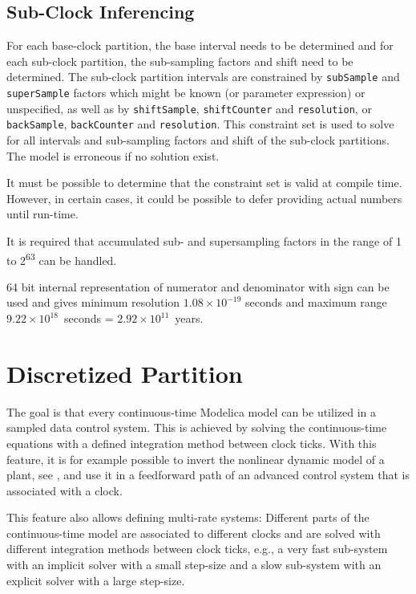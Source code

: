 \subsection{Sub-Clock Inferencing}\label{sub-clock-inferencing}

For each base-clock partition, the base interval needs to be determined and for each sub-clock partition, the sub-sampling factors and shift need to be determined.
The sub-clock partition intervals are constrained by \lstinline!subSample! and \lstinline!superSample! factors which might be known (or parameter expression) or unspecified, as well as by \lstinline!shiftSample!, \lstinline!shiftCounter! and \lstinline!resolution!, or \lstinline!backSample!, \lstinline!backCounter! and \lstinline!resolution!.
This constraint set is used to solve for all intervals and sub-sampling factors and shift of the sub-clock partitions.
The model is erroneous if no solution exist.

\begin{nonnormative}
It must be possible to determine that the constraint set is valid at compile time.
However, in certain cases, it could be possible to defer providing actual numbers until run-time.
\end{nonnormative}

It is required that accumulated sub- and supersampling factors in the range of 1 to 2\textsuperscript{63} can be handled.

\begin{nonnormative}
64 bit internal representation of numerator and denominator with sign can be used and gives minimum resolution $1.08\times 10^{-19}$ seconds and maximum range $9.22\times 10^{18}$~seconds = $2.92\times 10^{11}$~years.
\end{nonnormative}

\section{Discretized Partition}\label{continuous-time-equations-in-clocked-partitions}\label{discretized-partition}

\begin{nonnormative}
The goal is that every continuous-time Modelica model can be utilized in a sampled data control system.
This is achieved by solving the continuous-time equations with a defined integration method between clock ticks.
With this feature, it is for example possible to invert the nonlinear dynamic model of a plant, see \textcite{ThummelEtAl2005InverseModels}, and use it in a feedforward path of an advanced control system that is associated with a clock.

This feature also allows defining multi-rate systems: Different parts of the continuous-time model are associated to different clocks and are solved with different integration
methods between clock ticks, e.g., a very fast sub-system with an implicit solver with a small step-size and a slow sub-system with an explicit solver with a large step-size.
\end{nonnormative}

